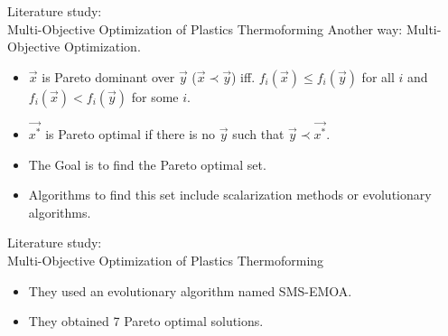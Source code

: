 \documentclass{beamer}
\begin{document}
	\begin{frame}{Literature study:\\ Multi-Objective Optimization of Plastics Thermoforming}
		Another way: Multi-Objective Optimization.
		\begin{itemize}
			\pause
			\item $\vec x$ is Pareto dominant over $\vec y$ ($\vec x\prec \vec y$) iff. $f_i(\vec x)\leq f_i(\vec y)$ for all $i$ and $f_i(\vec x)< f_i(\vec y)$ for some $i$.
			\pause
			\item $\vec {x^*}$ is Pareto optimal if there is no $\vec y$ such that $\vec y\prec \vec{x^*}$.
			\pause
			\item The Goal is to find the Pareto optimal set.
			\pause
			\item Algorithms to find this set include scalarization methods or evolutionary algorithms.
		\end{itemize}
	\end{frame}

	\begin{frame}{Literature study:\\ Multi-Objective Optimization of Plastics Thermoforming}
		\begin{itemize}
			\item They used an evolutionary algorithm named SMS-EMOA.
			\item They obtained 7 Pareto optimal solutions.
		\end{itemize}
	\end{frame}

	\begin{frame}
		\printbibliography
	\end{frame}
\end{document}
